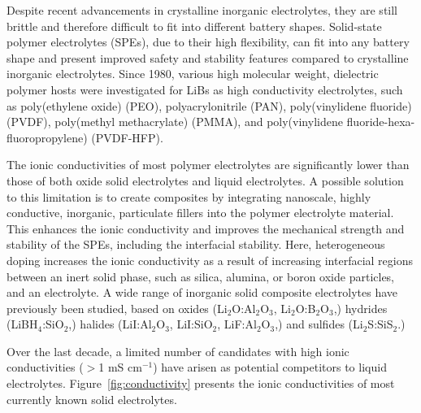 \documentclass[../main.tex]{subfiles}
\begin{document}
Despite recent advancements in crystalline inorganic electrolytes, they are still brittle and therefore difficult to fit into different battery shapes. Solid-state polymer electrolytes (SPEs), due to their high flexibility, can fit into any battery shape and present improved safety and stability features compared to crystalline inorganic electrolytes.\cite{DIRICAN201927} Since 1980, various high molecular weight, dielectric polymer hosts were investigated for LiBs as high conductivity electrolytes, such as poly(ethylene oxide) (PEO),\cite{fenton1973} polyacrylonitrile (PAN),\cite{abraham1990,dautzenberg1994} poly(vinylidene fluoride) (PVDF), \cite{arcella1999,kataoka2000,li2016} poly(methyl methacrylate) (PMMA), \cite{appetecchi1995,bohnke1993} and poly(vinylidene fluoride-hexa-fluoropropylene) (PVDF-HFP).\cite{abbrent2001,park2008,yang2014}

The ionic conductivities of most polymer electrolytes are significantly lower than those of both oxide solid electrolytes and liquid electrolytes.\cite{zhou2016} A possible solution to this limitation is to create composites by integrating nanoscale, highly conductive, inorganic, particulate fillers into the polymer electrolyte material.\cite{DIRICAN201927} This enhances the ionic conductivity and improves the mechanical strength and stability of the SPEs, including the interfacial stability.\cite{D0SC03121F} Here, heterogeneous doping increases the ionic conductivity as a result of increasing interfacial regions between an inert solid phase, such as silica, alumina, or boron oxide particles, and an electrolyte.\cite{uvarov2011} A wide range of inorganic solid composite electrolytes have previously been studied, based on oxides (Li$_{2}$O:Al$_{2}$O$_{3}$,\cite{B300908D} Li$_{2}$O:B$_{2}$O$_{3}$,\cite{Heitjans_2003,Indris2000,Indris2002}) hydrides (LiBH$_{4}$:SiO$_{2}$,\cite{blanchard2015}) halides (LiI:Al$_{2}$O$_{3}$,\cite{liang1973} LiI:SiO$_{2}$,\cite{phipps1983} LiF:Al$_{2}$O$_{3}$,\cite{uvarov1992}) and sulfides (Li$_{2}$S:SiS$_{2}$.\cite{pradel1986})

Over the last decade, a limited number of candidates with high ionic conductivities ($>$1 mS cm$^{-1}$) have arisen as potential competitors to liquid electrolytes.\cite{kanno_synthesis_2000, murayama_synthesis_2002, murayama_material_2004, minafra_influence_2019,bron_li_2013,whiteley_empowering_2014,huang_superionic_2019,yamane_crystal_2007,homma_crystal_2011} Figure~\ref{fig:conductivity} presents the ionic conductivities of most currently known solid electrolytes.\cite{Zhang2018se_review}
\end{document}
